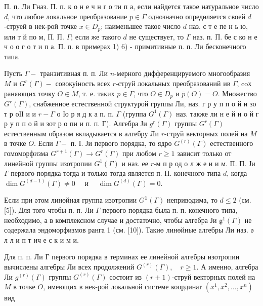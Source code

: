 \documentclass[10pt]{article}
\begin{document}
П. п. Ли Гназ. П. п. к о н е ч н г о ти п а, если найдется такое натуральное число $d$, что любое локальное преобразование $p \in \Gamma$ однозначно опредөляется своей $d$-струей в нек-рой точке $x \in D_{p}$; наименьшее такое число $d$ наз. с т е пе н ь ю, или т й по м, П. П. $\Gamma$; если же такого $d$ не существует, то $\Gamma$ наз. п. П. бе с ко н е ч о о г о т и п а. П. п. в примерах 1) 6) - примитивные п. п. Ли бесконечного типа.



Пусть $\Gamma-$ транзитивная п. п. Ли $n$-мерного дифференцируемого многообразия $M$ и $G^{r}(\Gamma)-$ совокуіность всех $r$-струй локальных преобразований ив $\Gamma$, coх раняющих точку $O \in M$, т. е. таких $p \in \Gamma$, что $O \in D_{p}$ и $\bar{p}(O)=O$. Множество $G^{r}(\Gamma)$, снабженное естественной структурой группы Ли, наз. г р у п п о й и зо т р оІІ и и $r-\Gamma$ о Іо р я д к а п. п. $\Gamma$ (группа $G^{1}(\Gamma)$ наз. также ли н е й н о й г р у п п о й и зот р о пи и п. п. Г). Алгебра Ји $g^{r}(\Gamma)$ группы $G^{r}(\Gamma)$ естественным образом вкладывается в алгебру Ли $r$-струй векторных полей на $M$ в точке $O$. Если $\Gamma-$ п. І. Ји первого порядка, то ядро $G^{(r)}(\Gamma)$ естественного гомоморфизма $G^{r+1}(\Gamma) \rightarrow G^{r}(\Gamma)$ при любом $r \geqslant 1$ зависит только от линейной группы изотропии $G^{1}(\Gamma)$ и наз. ее $r$-м п р од о л ж е и и м. П. П. Ји $\Gamma$ первого порядка тогда и только тогда является п. П. конечного типа $d$, когда $\operatorname{dim} G^{(d-1)}(\Gamma) \neq 0 \quad$ и $\quad \operatorname{dim} G^{(d)}(\Gamma)=0$.



Если при әтом линөйная группа изотропии $G^{\mathbf{1}}(\Gamma)$ неприводима, то $d \leqslant 2$ (см. [5]). Для того чтобы п. п. Ли $\Gamma$ первого порядка была п. п. конечного типа, необходимо, а в комплексном случае и достаточно, чтобы алгебра Ји $\mathfrak{g}^{1}(\Gamma)$ не содержала эндоморфизмов ранга 1 (см. [10]). Такиө линөйные алгебры Ли наз. ә л л и п т ич е с к и м и.



Для п. п. Ли Г первого порядка в терминах ее линейной алгебры изотропии вычислены алгебры Ли всех продолжений $G^{(r)}(\Gamma), \quad r \geqslant 1$. А именно, алгебра Ли $g^{(r)}(\Gamma)$ группы $G^{(r)}(\Gamma)$ состоит из $(r+1)$-струй векторных полей на $M$ в точке $O$, имеющих в нек-рой локальной системе координат $\left(x^{1}, x^{2}, \ldots, x^{n}\right)$ вид
\end{document}
